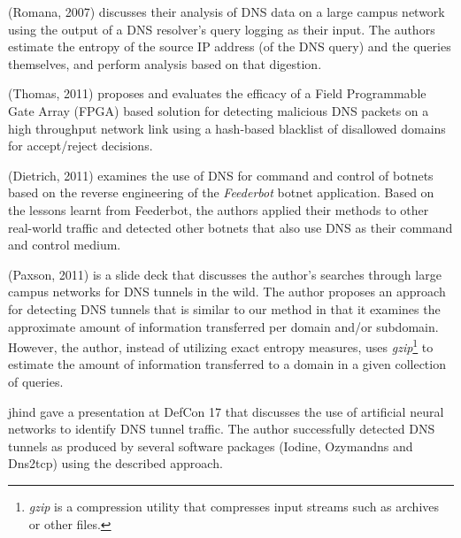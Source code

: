 \documentclass{llncs}
\begin{document}
(Romana, 2007)\cite{Romana2007} discusses their analysis of DNS data on a large
campus network using the output of a DNS resolver's query logging as their
input. 
The authors
estimate the entropy of the source IP address (of the DNS query) and the queries
themselves, and perform analysis based on that digestion.

(Thomas, 2011)\cite{Thomas2011} proposes and evaluates the efficacy of a Field
Programmable Gate Array (FPGA) based solution for detecting malicious DNS
packets on a high throughput network link using a hash-based blacklist of disallowed
domains for accept/reject decisions.

(Dietrich, 2011)\cite{Dietrich2011} examines the use of DNS for command and
control of botnets based on the reverse engineering of the \emph{Feederbot}
botnet application. Based on the lessons learnt from Feederbot, the authors
applied their methods to other real-world traffic and detected other botnets
that also use DNS as their command and control medium.

(Paxson, 2011)\cite{Paxson2011} is a slide deck that discusses the
author's searches through large campus networks for DNS tunnels in the
wild. The author proposes an approach for detecting DNS tunnels that
is similar to our method in that it examines the approximate amount of
information transferred per domain and/or subdomain. However, the
author, instead of utilizing exact entropy measures, uses
\emph{gzip}\footnote{\emph{gzip} is a compression utility that
  compresses input streams such as archives or other files.} to
estimate the amount of information transferred to a domain in a given
collection of queries.

jhind\cite{jhind2009} gave a presentation at DefCon 17 that discusses the use of
artificial neural networks to identify DNS tunnel traffic.
 The author successfully detected DNS tunnels as
produced by several software packages (Iodine, Ozymandns and Dns2tcp) using the
described approach.
\end{document}
